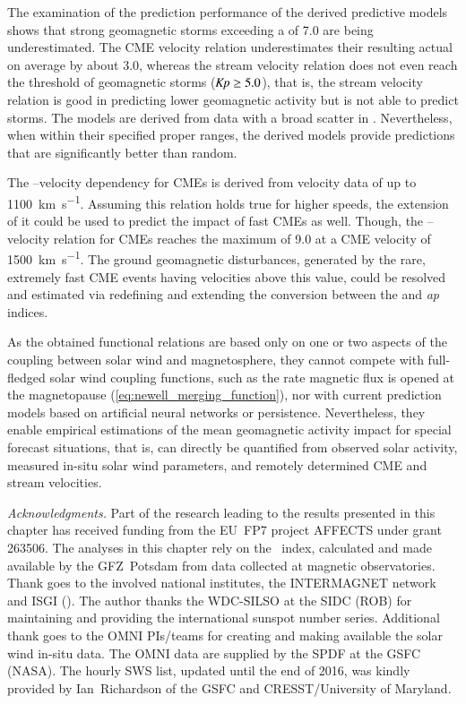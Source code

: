 The examination of the prediction performance of the derived predictive models shows that strong geomagnetic storms exceeding a \Kp{} of 7.0 are being underestimated. The CME velocity relation underestimates their resulting actual \Kp{} on average by about 3.0, whereas the stream velocity relation does not even reach the threshold of geomagnetic storms ($\text{\textit{Kp}} \geq 5.0$), that is, the stream velocity relation is good in predicting lower geomagnetic activity but is not able to predict storms.
The models are derived from data with a broad scatter in \Kp{}. Nevertheless, when within their specified proper ranges, the derived models provide predictions that are significantly better than random.

The \Kp--velocity dependency for CMEs is derived from velocity data of up to \SI{1100}{\km\per\s}. Assuming this relation holds true for higher speeds, the extension of it could be used to predict the \Kp{} impact of fast CMEs as well. Though, the \Kp--velocity relation for CMEs reaches the maximum \Kp{} of 9.0 at a CME velocity of \SI{1500}{\km\per\s}. The ground geomagnetic disturbances, generated by the rare, extremely fast CME events having velocities above this value, could be resolved and estimated via redefining and extending the conversion between the \Kp{} and \textit{ap} indices.

\pagebreak

As the obtained functional relations are based only on one or two aspects of the coupling between solar wind and magnetosphere, they cannot compete with full-fledged solar wind coupling functions, such as the rate magnetic flux is opened at the magnetopause (\autoref{eq:newell_merging_function}), nor with current prediction models based on artificial neural networks or \Kp{} persistence. Nevertheless, they enable empirical estimations of the mean geomagnetic activity impact for special forecast situations, that is, \Kp{} can directly be quantified from observed solar activity, measured in-situ solar wind parameters, and remotely determined CME and stream velocities.



\bigskip
{\small
\noindent \textit{Acknowledgments.} Part of the research leading to the results presented in this chapter has received funding from the EU~FP7 project AFFECTS under grant 263506.
The analyses in this chapter rely on the \Kp~index, calculated and made available by the GFZ~Potsdam from data collected at magnetic observatories. Thank goes to the involved national institutes, the INTERMAGNET network and ISGI (). The author thanks the WDC-SILSO at the SIDC (ROB) for maintaining and providing the international sunspot number series. Additional thank goes to the OMNI PIs/teams for creating and making available the solar wind in-situ data. The OMNI data are supplied by the SPDF at the GSFC (NASA). The hourly SWS list, updated until the end of 2016, was kindly provided by Ian~Richardson of the GSFC and CRESST/University of Maryland.
}

